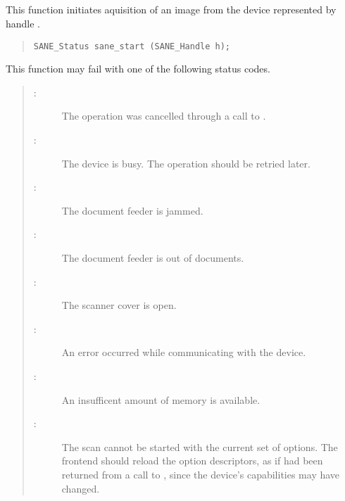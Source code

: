 \documentclass[11pt,DVIps]{report}
\begin{document}
\subsection{}

This function initiates aquisition of an image from the device
represented by handle .
\begin{quote}
\begin{verbatim}
SANE_Status sane_start (SANE_Handle h);
\end{verbatim}
\end{quote}
This function may fail with one of the following status codes.
\begin{quote}
\begin{description}
\item[:] The operation was cancelled through
  a call to .
\item[:] The device is busy. The
  operation should be retried later.
\item[:] The document feeder is jammed.
\item[:] The document feeder is out of
  documents.
\item[:] The scanner cover is open.
\item[:] An error occurred while communicating
  with the device.
\item[:] An insufficent amount of memory
  is available.
\item[:] The scan cannot be started with the current
  set of options. The frontend should reload the option descriptors, as if
   had been returned from a call to
  , since the device's capabilities may have
  changed.
\end{description}
\end{quote}


\subsection{}
\end{document}

